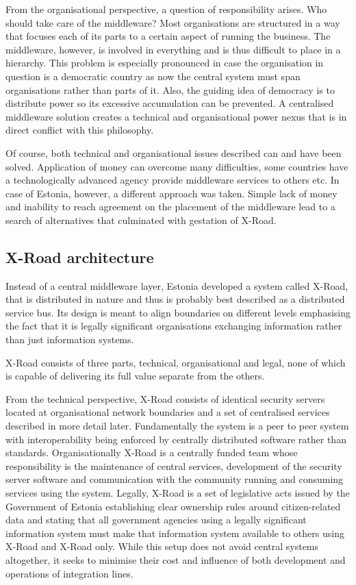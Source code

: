 \documentclass[10pt,a4paper]{article}
\begin{document}
\begin{appendices}
From the organisational perspective, a question of responsibility arises. Who should take care of the middleware? Most organisations are structured in a way that focuses each of its parts to a certain aspect of running the business. The middleware, however, is involved in everything and is thus difficult to place in a hierarchy. This problem is especially pronounced in case the organisation in question is a democratic country as now the central system must span organisations rather than parts of it. Also, the guiding idea of democracy is to distribute power so its excessive accumulation can be prevented. A centralised middleware solution creates a technical and organisational power nexus that is in direct conflict with this philosophy.

Of course, both technical and organisational issues described can and have been solved. Application of money can overcome many difficulties, some countries have a technologically advanced agency provide middleware services to others etc. In case of Estonia, however, a different approach was taken. Simple lack of money and inability to reach agreement on the placement of the middleware lead to a search of alternatives that culminated with gestation of X-Road. 

\subsection{X-Road architecture}
Instead of a central middleware layer, Estonia developed a system called X-Road, that is distributed in nature and thus is probably best described as a distributed service bus. Its design is meant to align boundaries on different levels emphasising the fact that it is legally significant organisations exchanging information rather than just information systems. 

X-Road consists of three parts, technical, organisational and legal, none of which is capable of delivering its full value separate from the others. 

From the technical perspective, X-Road consists of identical security servers located at organisational network boundaries and a set of centralised services described in more detail later. Fundamentally the system is a peer to peer system with interoperability being enforced by centrally distributed software rather than standards. Organisationally X-Road is a centrally funded team whose responsibility is the maintenance of central services, development of the security server software and communication with the community running and consuming services using the system. Legally, X-Road is a set of legislative acts issued by the Government of Estonia establishing clear ownership rules around citizen-related data and stating that all government agencies using a legally significant information system must make that information system available to others using X-Road and X-Road only\citep{xteemaarus}. While this setup does not avoid central systems altogether, it seeks to minimise their cost and influence of both development and operations of integration lines. 


\end{appendices}
\end{document}
